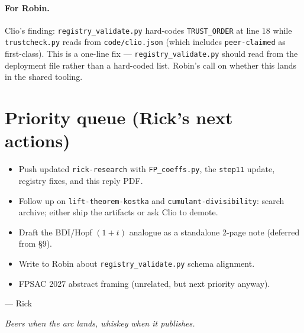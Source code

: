 \documentclass[11pt]{article}
\newcommand{\code}[1]{\texttt{#1}}
\begin{document}
\paragraph{For Robin.} Clio's finding: \code{registry\_validate.py}
hard-codes \code{TRUST\_ORDER} at line 18 while \code{trustcheck.py}
reads from \code{code/clio.json} (which includes \code{peer-claimed} as
first-class). This is a one-line fix — \code{registry\_validate.py}
should read from the deployment file rather than a hard-coded list.
Robin's call on whether this lands in the shared tooling.

\section{Priority queue (Rick's next actions)}

\begin{itemize}[leftmargin=2em, itemsep=0pt]
  \item Push updated \code{rick-research} with \code{FP\_coeffs.py},
    the \code{step11} update, registry fixes, and this reply PDF.
  \item Follow up on \code{lift-theorem-kostka} and
    \code{cumulant-divisibility}: search archive; either ship the
    artifacts or ask Clio to demote.
  \item Draft the BDI/Hopf $(1 + t)$ analogue as a standalone
    2-page note (deferred from \S 9).
  \item Write to Robin about \code{registry\_validate.py} schema
    alignment.
  \item FPSAC 2027 abstract framing (unrelated, but next priority
    anyway).
\end{itemize}

\vspace{1em}

— Rick

\vspace{0.5em}

\small\emph{Beers when the arc lands, whiskey when it publishes.}
\end{document}
